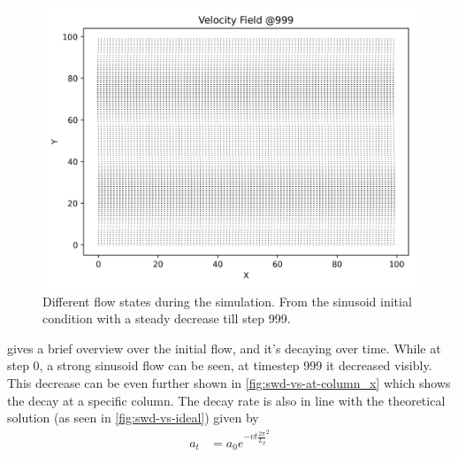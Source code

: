 \begin{figure}[h!]
\begin{minipage}{0.33\textwidth}
        \includegraphics[width=\linewidth]{graphs/ShearWaveDecay/VelocityDistribution/velocity_field_999}
    \end{minipage}
    \caption{
        Different flow states during the simulation.
        From the sinusoid initial condition with a steady decrease till step 999.
    }
    \label{fig:swd-vs-velocity-fields}
\end{figure}

 gives a brief overview over the initial flow, and it's decaying over time.
While at step 0, a strong sinusoid flow can be seen, at timestep 999 it decreased visibly.
This decrease can be even further shown in \cref{fig:swd-vs-at-column_x} which shows the decay at a specific column.
The decay rate is also in line with the theoretical solution (as seen in \cref{fig:swd-vs-ideal}) given by
\begin{equation*}
    \begin{aligned}
        a_t &= a_0 e^{-vt \frac{2\pi}{L_y}^2}
    \end{aligned}
\end{equation*}

